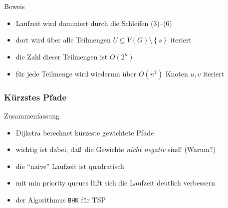 \documentclass[aspectratio=1610, 11pt]{beamer}
\newcommand\cbc[1]{\left\{{#1}\right\}}
\newcommand{\mytitle}{K\"urzstes Pfade}
\begin{document}
\begin{frame}
\begin{overprint}
\begin{exampleblock}{Beweis}
\begin{itemize}
				\item Laufzeit wird dominiert durch die Schleifen (3)--(6)
				\item dort wird \"uber alle Teilmengen $U\subseteq V(G)\setminus\cbc s$ iteriert
				\item die Zahl dieser Teilmengen ist $O(2^n)$
				\item f\"ur jede Teilmenge wird wiederum \"uber $O(n^2)$ Knoten $u,v$ iteriert
			\end{itemize}
		\end{exampleblock}
	\end{overprint}
\end{frame}

\begin{frame}\frametitle{\mytitle}
	\begin{exampleblock}{Zusammenfassung}
		\begin{itemize}
			\item Dijkstra berechnet k\"urzeste gewichtete Pfade
			\item wichtig ist dabei, da\ss\ die Gewichte \emph{nicht negativ} sind! (Warum?)
			\item die ``naive'' Laufzeit ist quadratisch
			\item mit min priority queues l\"a\ss t sich die Laufzeit deutlich verbessern
			\item der Algorithmus {\tt BHK} f\"ur TSP
		\end{itemize}
	\end{exampleblock}
\end{frame}
\end{document}
